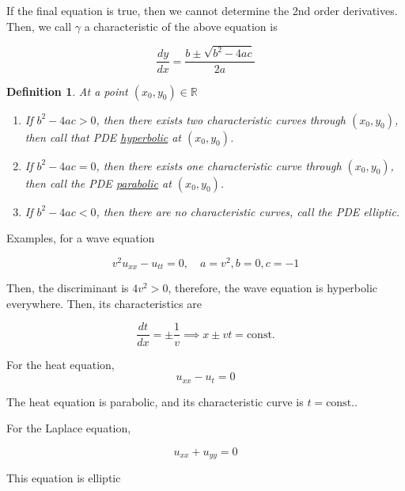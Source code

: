 \documentclass{article}
\newtheorem{definition}[theorem]{Definition}
\newtheorem{one minute paper}[theorem]{One Minute Paper}
\begin{document}
If the final equation is true, then we cannot determine the 2nd order derivatives. Then, we call $\gamma$ a characteristic of the above equation is 

\begin{equation}
    \frac{dy}{dx} = \frac{b \pm \sqrt{b^2 - 4ac}}{2a}
\end{equation}

\begin{definition}
    At a point $(x_0, y_0) \in \mathbb{R}$
    \begin{enumerate}
        \item If $b^2 - 4ac > 0$, then there exists two characteristic curves through $(x_0,y_0)$, then call that PDE \underline{hyperbolic} at $(x_0,y_0)$. 
        \item If $b^2 - 4ac = 0$, then there exists one characteristic curve through $(x_0,y_0)$, then call the PDE \underline{parabolic} at $(x_0,y_0)$. 
        \item If $b^2 - 4ac < 0$, then there are no characteristic curves, call the PDE elliptic. 
    \end{enumerate}
\end{definition}

Examples, for a wave equation

\begin{equation}
    v^2u_{xx} - u_{tt} = 0, \quad a=v^2, b=0, c=-1
\end{equation}

Then, the discriminant is $4v^2 > 0$, therefore, the wave equation is hyperbolic everywhere. Then, its characteristics are 

\begin{equation}
    \frac{dt}{dx} = \pm\frac{1}{v} \implies x \pm vt = \text{const.}
\end{equation}

For the heat equation, 
\begin{equation}
    u_{xx} - u_t = 0
\end{equation}

The heat equation is parabolic, and its characteristic curve is $t = \text{const.}$.

For the Laplace equation, 

\begin{equation}
    u_{xx} + u_{yy} =0
\end{equation}

This equation is elliptic
\end{document}
